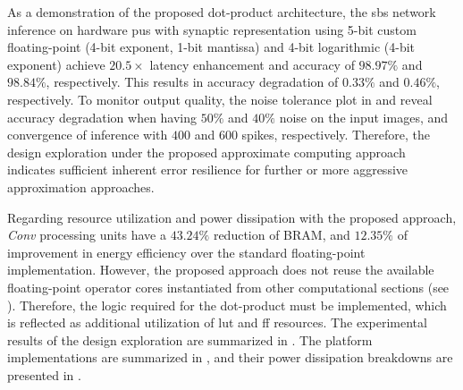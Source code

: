 As a demonstration of the proposed dot-product architecture, the \gls{sbs} network inference on hardware \glspl{pu} with synaptic representation using 5-bit custom floating-point (4-bit exponent, 1-bit mantissa) and 4-bit logarithmic (4-bit exponent) achieve $20.5\times$ latency enhancement and accuracy of $98.97\%$ and $98.84\%$, respectively. This results in accuracy degradation of $0.33\%$ and $0.46\%$, respectively. To monitor output quality, the noise tolerance plot in  and  reveal accuracy degradation when having $50\%$ and $40\%$ noise on the input images, and convergence of inference with $400$ and $600$ spikes, respectively. Therefore, the design exploration under the proposed approximate computing approach indicates sufficient inherent error resilience for further or more aggressive approximation approaches.

Regarding resource utilization and power dissipation with the proposed approach, \emph{Conv} processing units have a $43.24\%$ reduction of BRAM, and $12.35\%$ of improvement in energy efficiency over the standard floating-point implementation. However, the proposed approach does not reuse the available floating-point operator cores instantiated from other computational sections (see {}). Therefore, the logic required for the dot-product must be implemented, which is reflected as additional utilization of \gls{lut} and \gls{ff} resources. The experimental results of the design exploration are summarized in . The platform implementations are summarized in , and their power dissipation breakdowns are presented in .


